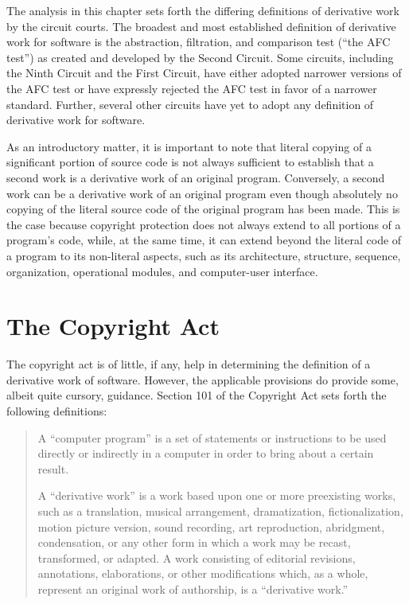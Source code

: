 The analysis in this chapter sets forth the differing definitions of
derivative work by the circuit courts. The broadest and most
established definition of derivative work for software is the
abstraction, filtration, and comparison test (``the AFC test'') as
created and developed by the Second Circuit. Some circuits, including
the Ninth Circuit and the First Circuit, have either adopted narrower
versions of the AFC test or have expressly rejected the AFC test in
favor of a narrower standard. Further, several other circuits have yet
to adopt any definition of derivative work for software.

As an introductory matter, it is important to note that literal copying of
a significant portion of source code is not always sufficient to establish
that a second work is a derivative work of an original
program. Conversely, a second work can be a derivative work of an original
program even though absolutely no copying of the literal source code of
the original program has been made. This is the case because copyright
protection does not always extend to all portions of a program's code,
while, at the same time, it can extend beyond the literal code of a
program to its non-literal aspects, such as its architecture, structure,
sequence, organization, operational modules, and computer-user interface.

\section{The Copyright Act}

The copyright act is of little, if any, help in determining the definition
of a derivative work of software. However, the applicable provisions do
provide some, albeit quite cursory, guidance. Section 101 of the Copyright
Act sets forth the following definitions:

\begin{quotation}
A ``computer program'' is a set of statements or instructions to be used
directly or indirectly in a computer in order to bring about a certain
result.

A ``derivative work'' is a work based upon one or more preexisting works,
such as a translation, musical arrangement, dramatization,
fictionalization, motion picture version, sound recording, art
reproduction, abridgment, condensation, or any other form in which a work
may be recast, transformed, or adapted. A work consisting of editorial
revisions, annotations, elaborations, or other modifications which, as a
whole, represent an original work of authorship, is a ``derivative work.''
\end{quotation}

